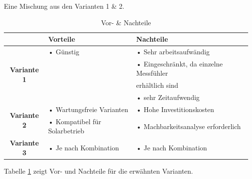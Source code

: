 Eine Mischung aus den Varianten 1 \& 2.\\

\begin{table}[h]
  \centering
  \label{tab:mcu}
  \small
  \caption{Vor- \& Nachteile}
    \begin{tabular}{c|l|l}
          & \textbf{Vorteile} & \textbf{Nachteile} \\
    \toprule
    \multirow{4}[2]{*}{\textbf{Variante 1}} & • Günstig & • Sehr arbeitsaufwändig \\
          &  & • Eingeschränkt, da einzelne Messfühler \\
          &  & \hspace{0.3cm} erhältlich sind \\
          &  & • sehr Zeitaufwendig \\
    \hline
    \multirow{2}[1]{*}{\textbf{Variante 2}} & • Wartungsfreie Varianten & • Hohe Investitionskosten \\
          & • Kompatibel für Solarbetrieb & • Machbarkeitsanalyse erforderlich \\
    \hline
    \multirow{4}[1]{*}{\textbf{Variante 3}} &  &   \\
          & •  Je nach Kombination & •  Je nach Kombination  \\
          &    &  \\
    \end{tabular}%
  \label{tab:sensoren}
\end{table}
Tabelle \ref{tab:sensoren} zeigt Vor- und Nachteile für die erwähnten Varianten.\\
%

